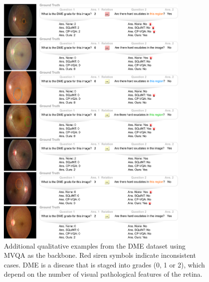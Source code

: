 \begin{figure}[!t]
\centering
\includegraphics[width=0.85\textwidth]{Figures/Part2_Consist/02_logic/examples_dme_supplementary1.pdf}
\caption{Additional qualitative examples from the DME dataset using MVQA as the backbone. Red siren symbols indicate inconsistent cases. DME is a disease that is staged into grades (0, 1 or 2), which depend on the number of visual pathological features of the retina.}
\label{fig:examples_introspect5}
\end{figure}


